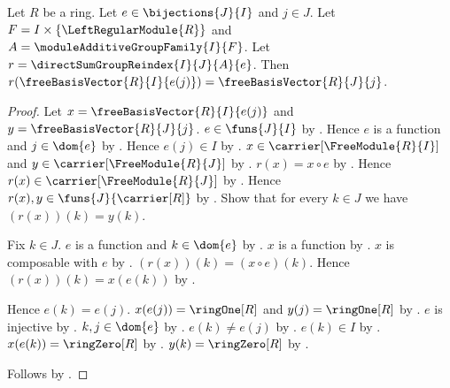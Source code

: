 \begin{proposition}\label{free_basis_vector_reindex}
    Let $R$ be a ring.
    Let $e\in\bijections{J}{I}$ and $j\in J$.
    Let $F=I\times\{\LeftRegularModule{R}\}$ and
        $A=\moduleAdditiveGroupFamily{I}{F}$.
    Let $r=\directSumGroupReindex{I}{J}{A}{e}$.
    Then $r(\freeBasisVector{R}{I}{e(j)})
        =\freeBasisVector{R}{J}{j}$.
\end{proposition}
\begin{proof}
    Let $x=\freeBasisVector{R}{I}{e(j)}$ and
        $y=\freeBasisVector{R}{J}{j}$.
    $e\in\funs{J}{I}$ by .
    Hence $e$ is a function and $j\in\dom{e}$ by
        .
    Hence $e(j)\in I$ by .
    $x\in\carrier[\FreeModule{R}{I}]$ and
        $y\in\carrier[\FreeModule{R}{J}]$ by
        .
    $r(x)=x\circ e$ by .
    Hence $r(x)\in\carrier[\FreeModule{R}{J}]$ by
        .
    Hence $r(x),y\in\funs{J}{\carrier[R]}$ by
        .
    Show that for every $k\in J$ we have $(r(x))(k)=y(k)$.
    \begin{subproof}
        Fix $k\in J$.
        $e$ is a function and $k\in\dom{e}$ by
            .
        $x$ is a function by
            .
        $x$ is composable with $e$ by
            .
        $(r(x))(k)=(x\circ e)(k)$.
        Hence $(r(x))(k)=x(e(k))$ by .
        \begin{byCase}
            Hence $e(k)=e(j)$.
            $x(e(j))=\ringOne[R]$ and $y(j)=\ringOne[R]$ by
                .
            $e$ is injective by .
            $k,j\in\dom{e}$ by .
            $e(k)\neq e(j)$ by
                .
            $e(k)\in I$ by .
            $x(e(k))=\ringZero[R]$ by
                .
            $y(k)=\ringZero[R]$ by
                .
        \end{byCase}
    \end{subproof}
    Follows by .
\end{proof}

